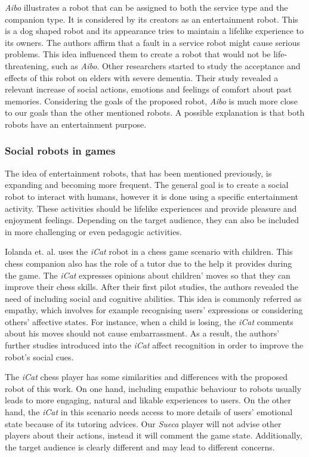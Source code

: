 \emph{Aibo} illustrates a robot that can be assigned to both the service type and the companion type.
It is considered by its creators as an entertainment robot.
This is a dog shaped robot and its appearance tries to maintain a lifelike experience to its owners.
The authors affirm that a fault in a service robot might cause serious problems.
This idea influenced them to create a robot that would not be life-threatening, such as \emph{Aibo}.
Other researchers started to study the acceptance and effects of this robot on elders with severe dementia.
Their study revealed a relevant increase of social actions, emotions and feelings of comfort about past memories.
Considering the goals of the proposed robot, \emph{Aibo} is much more close to our goals than the other mentioned robots.
A possible explanation is that both robots have an entertainment purpose.



\subsubsection{Social robots in games}

The idea of entertainment robots, that has been mentioned previously, is expanding and becoming more frequent.
The general goal is to create a social robot to interact with humans, however it is done using a specific entertainment activity.
These activities should be lifelike experiences and provide pleasure and enjoyment feelings.
Depending on the target audience, they can also be included in more challenging or even pedagogic activities.

Iolanda et. al. uses the \emph{iCat} robot in a chess game scenario with children.
This chess companion also has the role of a tutor due to the help it provides during the game.
The \emph{iCat} expresses opinions about children' moves so that they can improve their chess skills.
After their first pilot studies, the authors revealed the need of including social and cognitive abilities.
This idea is commonly referred as empathy, which involves for example recognising users' expressions or considering others' affective states.
For instance, when a child is losing, the \emph{iCat} comments about his moves should not cause embarrassment.
As a result, the authors' further studies introduced into the \emph{iCat} affect recognition in order to improve the robot's social cues.

The \emph{iCat} chess player has some similarities and differences with the proposed robot of this work.
On one hand, including empathic behaviour to robots usually leads to more engaging, natural and likable experiences to users.
On the other hand, the \emph{iCat} in this scenario needs access to more details of users' emotional state because of its tutoring advices. Our \emph{Sueca} player will not advise other players about their actions, instead it will comment the game state.
Additionally, the target audience is clearly different and may lead to different concerns.


